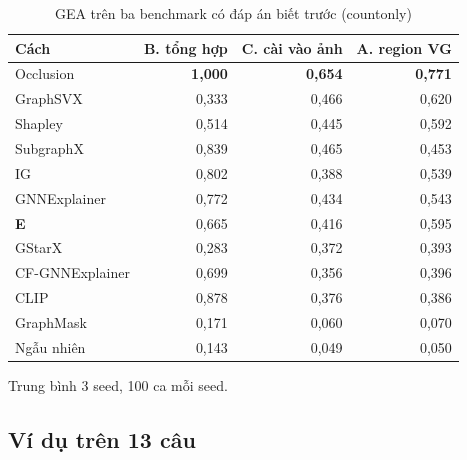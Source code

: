 \begin{table}[t]
  \caption{GEA trên ba benchmark có đáp án biết trước (countonly)}
  \label{tab:xai-gt}
  \centering
  \footnotesize
  \begin{tabular}{@{}lrrr@{}}
    \toprule
    Cách & B. tổng hợp & C. cài vào ảnh & A. region VG \\
    \midrule
    Occlusion & \textbf{1,000} & \textbf{0,654} & \textbf{0,771} \\
    GraphSVX & 0,333 & 0,466 & 0,620 \\
    Shapley & 0,514 & 0,445 & 0,592 \\
    SubgraphX & 0,839 & 0,465 & 0,453 \\
    IG & 0,802 & 0,388 & 0,539 \\
    GNNExplainer & 0,772 & 0,434 & 0,543 \\
    \textbf{E} & 0,665 & 0,416 & 0,595 \\
    GStarX & 0,283 & 0,372 & 0,393 \\
    CF-GNNExplainer & 0,699 & 0,356 & 0,396 \\
    CLIP & 0,878 & 0,376 & 0,386 \\
    GraphMask & 0,171 & 0,060 & 0,070 \\
    Ngẫu nhiên & 0,143 & 0,049 & 0,050 \\
    \bottomrule
  \end{tabular}
  \par\smallskip
  {\scriptsize\raggedright
    Trung bình 3 seed, 100 ca mỗi seed.\par}
\end{table}

\subsection{Ví dụ trên 13 câu}\label{sec:xai-cases}

